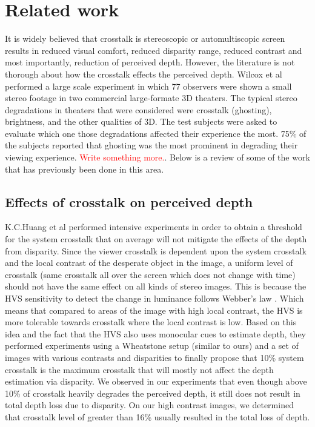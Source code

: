\chapter{Related work}
\label{chap:relatedWork}
It is widely believed that crosstalk is stereoscopic or automultiscopic screen results in reduced visual comfort, reduced disparity range, reduced contrast and most importantly, reduction of perceived depth. However, the literature is not thorough about how the  crosstalk effects the perceived depth. Wilcox et al \cite{wilcox2003determinants} performed a large scale experiment in which 77 observers were shown a small stereo footage in two commercial large-formate 3D theaters. The typical stereo degradations in theaters that were considered were crosstalk (ghosting), brightness, and the other qualities of 3D. The test subjects were asked to evaluate which one those degradations affected their experience the most. 75\% of the subjects reported that ghosting was the most prominent in degrading their viewing experience.
\textcolor{red}{Write something more.}. Below is a review of some of the work that has previously been done in this area.

\section{Effects of crosstalk on perceived depth}
K.C.Huang et al \cite{huang2003crosstalk} performed intensive experiments in order to obtain a threshold for the system crosstalk that on average will not mitigate the effects of the depth from disparity. Since the viewer crosstalk is dependent upon the system crosstalk and the local contrast of the desperate object in the image, a uniform level of crosstalk (same crosstalk all over the screen which does not change with time) should not have the same effect on all kinds of stereo images. This is because the HVS sensitivity to detect the change in luminance follows Webber's law \cite{webber}. Which means that compared to areas of the image with high local contrast, the HVS is more tolerable towards crosstalk where the local contrast is low. Based on this idea and the fact that the HVS also uses monocular cues to estimate depth, they performed experiments using a Wheatstone setup (similar to ours) and a set of images with various contrasts and disparities to finally propose that 10\% system crosstalk is the maximum crosstalk that will mostly not affect the depth estimation via disparity. We observed in our experiments that even though above 10\% of crosstalk heavily degrades the perceived depth, it still does not result in total depth loss due to disparity. On our high contrast images, we determined that crosstalk level of greater than 16\% usually resulted in the total loss of depth.

